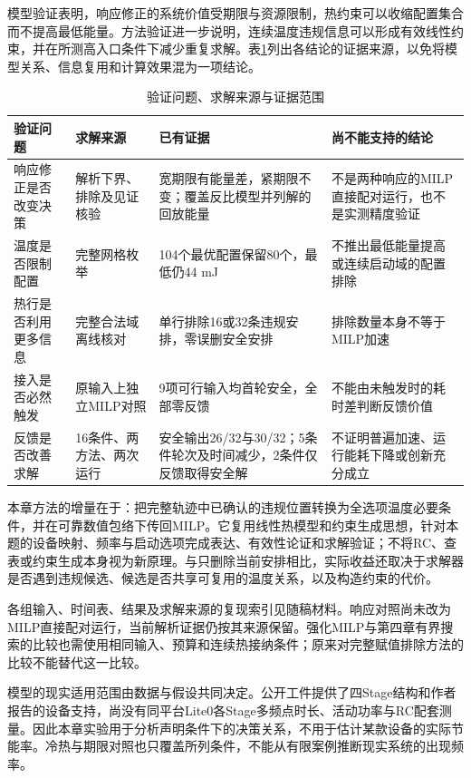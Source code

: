 模型验证表明，响应修正的系统价值受期限与资源限制，热约束可以收缩配置集合而不提高最低能量。方法验证进一步说明，连续温度违规信息可以形成有效线性约束，并在所测高入口条件下减少重复求解。表\ref{tab:evidence-map}列出各结论的证据来源，以免将模型关系、信息复用和计算效果混为一项结论。

\begin{table}[htbp]
\centering\small
\caption{验证问题、求解来源与证据范围}\label{tab:evidence-map}
\setlength{\tabcolsep}{4pt}
\begin{tabular}{@{}p{2.2cm}p{2.5cm}p{4.4cm}p{4.7cm}@{}}
\toprule
验证问题 & 求解来源 & 已有证据 & 尚不能支持的结论\\
\midrule
响应修正是否改变决策 & 解析下界、排除及见证核验 & 宽期限有能量差，紧期限不变；覆盖反比模型并列解的回放能量 & 不是两种响应的MILP直接配对运行，也不是实测精度验证\\
温度是否限制配置 & 完整网格枚举 & 104个最优配置保留80个，最低仍44 mJ & 不推出最低能量提高或连续启动域的配置排除\\
热行是否利用更多信息 & 完整合法域离线核对 & 单行排除16或32条违规安排，零误删安全安排 & 排除数量本身不等于MILP加速\\
接入是否必然触发 & 原输入上独立MILP对照 & 9项可行输入均首轮安全，全部零反馈 & 不能由未触发时的耗时差判断反馈价值\\
反馈是否改善求解 & 16条件、两方法、两次运行 & 安全输出26/32与30/32；5条件轮次及时间减少，2条件仅反馈取得安全解 & 不证明普遍加速、运行能耗下降或创新充分成立\\
\bottomrule
\end{tabular}
\end{table}

本章方法的增量在于：把完整轨迹中已确认的违规位置转换为全选项温度必要条件，并在可靠数值包络下传回MILP。它复用线性热模型和约束生成思想，针对本题的设备映射、频率与启动选项完成表达、有效性论证和求解验证；不将RC、查表或约束生成本身视为新原理。与只删除当前安排相比，实际收益还取决于求解器是否遇到违规候选、候选是否共享可复用的温度关系，以及构造约束的代价。

各组输入、时间表、结果及求解来源的复现索引见随稿材料\cite{artifact-index}。响应对照尚未改为MILP直接配对运行，当前解析证据仍按其来源保留。强化MILP与第四章有界搜索的比较也需使用相同输入、预算和连续热接纳条件；原来对完整赋值排除方法的比较不能替代这一比较。

模型的现实适用范围由数据与假设共同决定。公开工件提供了四Stage结构和作者报告的设备支持，尚没有同平台Lite0各Stage多频点时长、活动功率与RC配套测量。因此本章实验用于分析声明条件下的决策关系，不用于估计某款设备的实际节能率。冷热与期限对照也只覆盖所列条件，不能从有限案例推断现实系统的出现频率。

